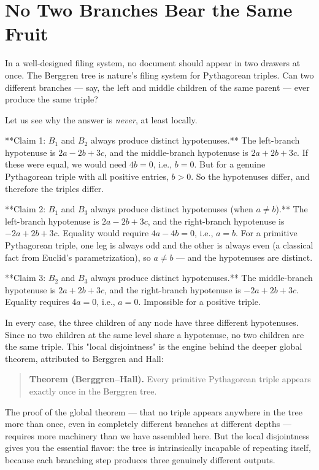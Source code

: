 \documentclass[12pt, letterpaper, openany]{book}
\theoremstyle{definition}
\theoremstyle{remark}
\begin{document}
\section*{No Two Branches Bear the Same Fruit}


In a well-designed filing system, no document should appear in two drawers at once. The Berggren tree is nature's filing system for Pythagorean triples. Can two different branches --- say, the left and middle children of the same parent --- ever produce the same triple?

Let us see why the answer is \textit{never}, at least locally.

**Claim 1: $B_1$ and $B_2$ always produce distinct hypotenuses.** The left-branch hypotenuse is $2a - 2b + 3c$, and the middle-branch hypotenuse is $2a + 2b + 3c$. If these were equal, we would need $4b = 0$, i.e., $b = 0$. But for a genuine Pythagorean triple with all positive entries, $b > 0$. So the hypotenuses differ, and therefore the triples differ.

**Claim 2: $B_1$ and $B_3$ always produce distinct hypotenuses (when $a \neq b$).** The left-branch hypotenuse is $2a - 2b + 3c$, and the right-branch hypotenuse is $-2a + 2b + 3c$. Equality would require $4a - 4b = 0$, i.e., $a = b$. For a primitive Pythagorean triple, one leg is always odd and the other is always even (a classical fact from Euclid's parametrization), so $a \neq b$ --- and the hypotenuses are distinct.

**Claim 3: $B_2$ and $B_3$ always produce distinct hypotenuses.** The middle-branch hypotenuse is $2a + 2b + 3c$, and the right-branch hypotenuse is $-2a + 2b + 3c$. Equality requires $4a = 0$, i.e., $a = 0$. Impossible for a positive triple.

In every case, the three children of any node have three different hypotenuses. Since no two children at the same level share a hypotenuse, no two children are the same triple. This "local disjointness" is the engine behind the deeper global theorem, attributed to Berggren and Hall:


\begin{quote}
\textbf{Theorem (Berggren--Hall).} Every primitive Pythagorean triple appears exactly once in the Berggren tree.
\end{quote}


The proof of the global theorem --- that no triple appears anywhere in the tree more than once, even in completely different branches at different depths --- requires more machinery than we have assembled here. But the local disjointness gives you the essential flavor: the tree is intrinsically incapable of repeating itself, because each branching step produces three genuinely different outputs.
\end{document}
